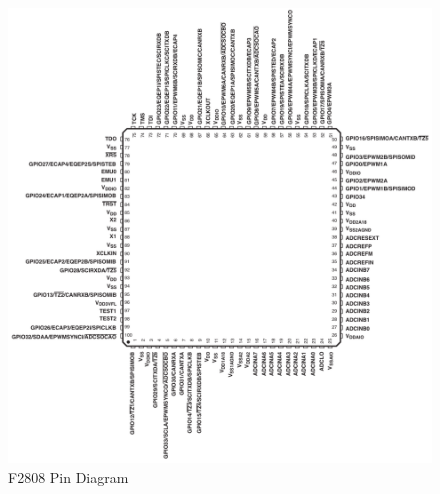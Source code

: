 \begin{figure}[ptb]
	\begin{centering}
		\includegraphics[scale=0.75]{Hardware/Figures/hardware-f2808_pin_diagram.pdf}
		\caption[F2808 Pin Diagram]{F2808 Pin Diagram \cite{ref:2006-ti-f2808_users_guide}}
		\label{fig:hardware:f2808_pin_diagram}
	\end{centering}
\end{figure}

